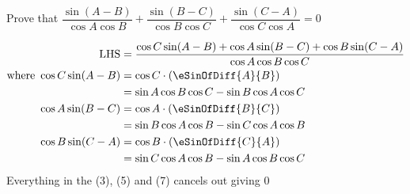 
%
%
%
%
% 
% 

\question Prove that $\dfrac{\sin(A-B)}{\cos A\cos B} + \dfrac{\sin(B-C)}{\cos B\cos C} 
+ \dfrac{\sin(C-A)}{\cos C\cos A} = 0$

\insertQR{}

\ifprintanswers
\fi 

\begin{solution}
  \begin{fullwidth}
    \begin{align}
      \text{LHS} &= \dfrac{\cos C\sin(A-B) + \cos A\sin(B-C) + 
        \cos B\sin(C-A)}{\cos A\cos B\cos C} \\
      \text{where }\cos C\sin(A-B) &= \cos C\cdot(\eSinOfDiff{A}{B}) \\
           &= \sin A\cos B\cos C - \sin B\cos A\cos C \\
       \cos A\sin(B-C) &= \cos A\cdot(\eSinOfDiff{B}{C}) \\
          &= \sin B\cos A\cos B - \sin C\cos A\cos B \\
       \cos B\sin(C-A) &= \cos B\cdot(\eSinOfDiff{C}{A}) \\
          &= \sin C\cos A\cos B - \sin A\cos B\cos C
    \end{align}
    Everything in the (3), (5) and (7) cancels out giving $0$
  \end{fullwidth}
\end{solution}
